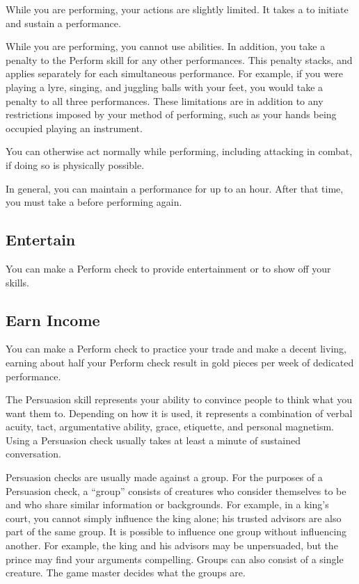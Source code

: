         While you are performing, your actions are slightly limited.
        It takes a  to initiate and sustain a performance.

        While you are performing, you cannot use  abilities.
        In addition, you take a  penalty to the Perform skill for any other performances.
        This penalty stacks, and applies separately for each simultaneous performance.
        For example, if you were playing a lyre, singing, and juggling balls with your feet, you would take a  penalty to all three performances.
        These limitations are in addition to any restrictions imposed by your method of performing, such as your hands being occupied playing an instrument.

        You can otherwise act normally while performing, including attacking in combat, if doing so is physically possible.

        In general, you can maintain a performance for up to an hour.
        After that time, you must take a  before performing again.

    \subsection{Entertain}
        You can make a Perform check to provide entertainment or to show off your skills.

    \subsection{Earn Income}
        You can make a Perform check to practice your trade and make a decent living, earning about half your Perform check result in gold pieces per week of dedicated performance.

\newpage
{}
        The Persuasion skill represents your ability to convince people to think what you want them to.
        Depending on how it is used, it represents a combination of verbal acuity, tact, argumentative ability, grace, etiquette, and personal magnetism.
        Using a Persuasion check usually takes at least a minute of sustained conversation.

        Persuasion checks are usually made against a group. For the purposes of a Persuasion check, a ``group'' consists of creatures who consider themselves to be  and who share similar information or backgrounds. For example, in a king's court, you cannot simply influence the king alone; his trusted advisors are also part of the same group. It is possible to influence one group without influencing another. For example, the king and his advisors may be unpersuaded, but the prince may find your arguments compelling. Groups can also consist of a single creature. The game master decides what the groups are.

